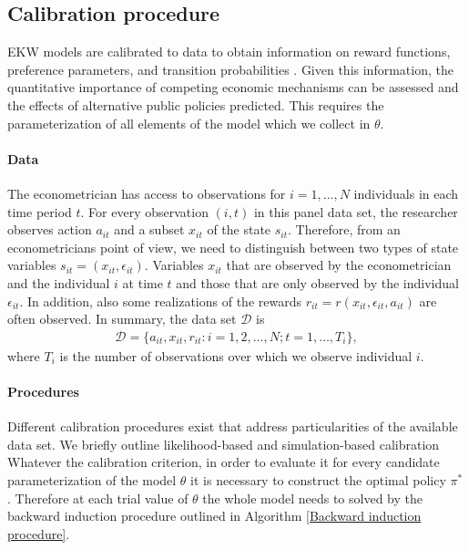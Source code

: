 \subsection{Calibration procedure}\label{Estimation}
EKW models are calibrated to data to obtain information on reward functions, preference parameters, and transition probabilities \citep{Davidson.2003,Gourieroux.1996}. Given this information, the quantitative importance of competing economic mechanisms can be assessed and the effects of alternative public policies predicted. This requires the parameterization of all elements of the model which we collect in $\theta$.

\paragraph{Data} The econometrician has access to observations for $i = 1, \hdots, N$ individuals in each time period $t$. For every observation $(i, t)$ in this panel data set, the researcher observes action $a_{it}$ and a subset $x_{it}$ of the state $s_{it}$. Therefore, from an econometricians point of view, we need to distinguish between two types of state variables $s_{it} = (x_{it}, \epsilon_{it})$. Variables $x_{it}$ that are observed by the econometrician and the individual $i$ at time $t$ and those that are only observed by the individual $\epsilon_{it}$.  In addition, also some realizations of the rewards $r_{it} = r(x_{it}, \epsilon_{it}, a_{it})$ are often observed. In summary, the data set $\mathcal{D}$ is
%
\begin{align*}
  \mathcal{D} = \{a_{it}, x_{it}, r_{it}: i = 1,2, \hdots, N; t = 1, \hdots, T_i\},
\end{align*}
where $T_i$ is the number of observations over which we observe individual $i$.

\paragraph{Procedures} Different calibration procedures exist that address particularities of the available data set. We briefly outline likelihood-based and simulation-based calibration  Whatever the calibration criterion, in order to evaluate it for every candidate parameterization of the model $\theta$ it is necessary to construct the optimal policy $\pi^*$. Therefore at each trial value of $\theta$ the whole model needs to solved by the backward induction procedure outlined in Algorithm \ref{Backward induction procedure}.

